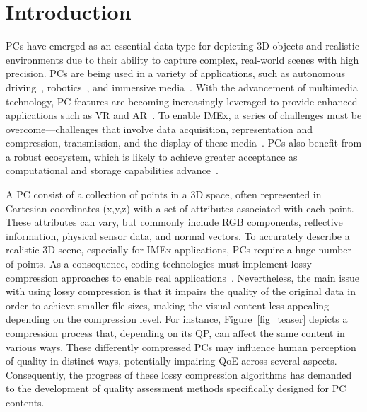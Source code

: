 \documentclass[final,3p,times,twocolumn]{elsarticle}
\begin{document}


\section{Introduction}


\glspl{PC} have emerged as an essential data type for depicting \gls{3D} objects and realistic environments due to their ability to capture complex, real-world scenes with high precision. \glspl{PC} are being used in a variety of applications, such as autonomous driving~\cite{LIANG2022103667}, robotics~\cite{LI2025104503}, and immersive media~\cite{WANG2024104292}. With the advancement of multimedia technology, \gls{PC} features are becoming increasingly leveraged to provide enhanced applications such as \gls{VR} and \gls{AR}~\cite{WANG2024104110, LI2022103641}. To enable \gls{IMEx}, a series of challenges must be overcome—challenges that involve data acquisition, representation and compression, transmission, and the display of these media~\cite{farias2023quality}. \glspl{PC} also benefit from a robust ecosystem, which is likely to achieve greater acceptance as computational and storage capabilities advance~\cite{perra2020an,astola2020jpeg}.

A \gls{PC} consist of a collection of points in a \gls{3D} space, often represented in Cartesian coordinates (x,y,z) with a set of attributes associated with each point. These attributes can vary, but commonly include \gls{RGB} components, reflective information, physical sensor data, and normal vectors. To accurately describe a realistic \gls{3D} scene, especially for \gls{IMEx} applications, \glspl{PC} require a huge number of points.  As a consequence, coding technologies must implement lossy compression approaches to enable real applications~\cite{LUO2025104481, PAN2024104243}. Nevertheless, the main issue with using lossy compression is that it impairs the quality of the original data in order to achieve smaller file sizes, making the visual content less appealing depending on the compression level. For instance, Figure~\ref{fig_teaser} depicts a compression process that, depending on its \gls{QP}, can affect the same content in various ways. These differently compressed \glspl{PC} may influence human perception of quality in distinct ways, potentially impairing \gls{QoE} across several aspects. Consequently, the progress of these lossy compression algorithms has demanded to the development of quality assessment methods specifically designed for \gls{PC} contents.
\end{document}

